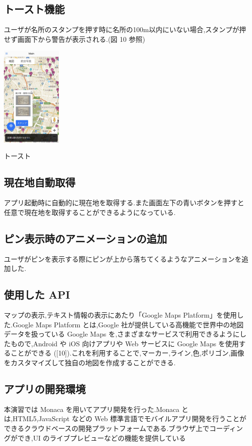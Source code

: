 \documentclass[a4paper, twoside]{jarticle}
\makeatletter
\newenvironment{figurehere}
  {\def\@captype{figure}}
  {}
\makeatother
\begin{document}
\begin{multicols}{2}
\subsection{トースト機能}
ユーザが名所のスタンプを押す時に名所の100m以内にいない場合,スタンプが押せず画面下から警告が表示される.(図 10 参照)
\begin{figurehere}
\begin{center}
\includegraphics[bb=30 50 550 1300,width=3cm]{./image11.jpg}%
\end{center}
\caption{トースト}\label{fig:11}
\end{figurehere}

\subsection{現在地自動取得}
アプリ起動時に自動的に現在地を取得する.また画面左下の青いボタンを押すと任意で現在地を取得することができるようになっている.

\subsection{ピン表示時のアニメーションの追加}
ユーザがピンを表示する際にピンが上から落ちてくるようなアニメーションを追加した.

\subsection{使用した API}
マップの表示,テキスト情報の表示にあたり「Google Maps Platform」を使用した.Google Maps Platform とは,Google 社が提供している高機能で世界中の地図データを扱っている Google Maps を,さまざまなサービスで利用できるようにしたもので,Android や iOS 向けアプリや Web サービスに Google Maps を使用することができる ([10]).これを利用することで,マーカー,ライン,色,ポリゴン,画像をカスタマイズして独自の地図を作成することができる.

\subsection{アプリの開発環境}
本演習では Monaca を用いてアプリ開発を行った.Monaca とは,HTML5,JavaScript などの Web 標準言語でモバイルアプリ開発を行うことができるクラウドベースの開発プラットフォームである.ブラウザ上でコーディングができ,UI のライブプレビューなどの機能を提供している


\end{multicols}
\end{document}
